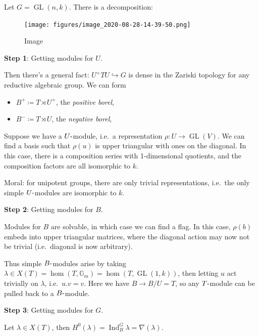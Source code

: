 \begin{example}

Let \(G = \operatorname{GL}(n, k)\). There is a decomposition:

\begin{figure}
\centering
\texttt{[image: figures/image\_2020-08-28-14-39-50.png]}
\caption{Image}
\end{figure}

\end{example}

\textbf{Step 1}: Getting modules for \(U\).

Then there's a general fact: \(U^+ T U \hookrightarrow G\) is dense in
the Zariski topology for any reductive algebraic group. We can form

\begin{itemize}
\tightlist
\item
  \(B^+ \coloneqq T\rtimes U^+\), the \emph{positive borel},
\item
  \(B^- \coloneqq T\rtimes U\), the \emph{negative borel},
\end{itemize}

Suppose we have a \(U{\hbox{-}}\)module, i.e.~a representation
\(\rho: U \to \operatorname{GL}(V)\). We can find a basis such that
\(\rho(u)\) is upper triangular with ones on the diagonal. In this case,
there is a composition series with 1-dimensional quotients, and the
composition factors are all isomorphic to \(k\).

Moral: for unipotent groups, there are only trivial representations,
i.e.~the only simple \(U{\hbox{-}}\)modules are isomorphic to \(k\).

\textbf{Step 2}: Getting modules for \(B\).

Modules for \(B\) are solvable, in which case we can find a flag. In
this case, \(\rho(b)\) embeds into upper triangular matrices, where the
diagonal action may now not be trivial (i.e.~diagonal is now arbitrary).

Thus simple \(B{\hbox{-}}\)modules arise by taking
\(\lambda \in X(T) = \hom(T, {\mathbb{G}}_m) = \hom(T, \operatorname{GL}(1, k))\),
then letting \(u\) act trivially on \(\lambda\), i.e.~\(u.v = v\). Here
we have \(B \to B/U = T\), so any \(T{\hbox{-}}\)module can be pulled
back to a \(B{\hbox{-}}\)module.

\textbf{Step 3}: Getting modules for \(G\).

Let \(\lambda \in X(T)\), then
\(H^0(\lambda) = \operatorname{Ind}_B^G \lambda = \nabla(\lambda)\).

